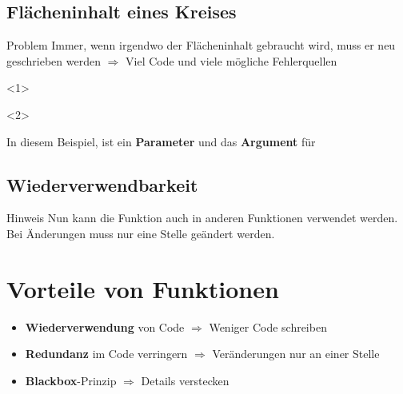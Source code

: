 \subsection{Flächeninhalt eines Kreises}
\begin{frame}
    \slidehead

    \begin{block}{Problem}
        Immer, wenn irgendwo der Flächeninhalt gebraucht wird, muss er neu geschrieben werden $\Rightarrow$ Viel Code und viele mögliche Fehlerquellen
    \end{block}
\end{frame}

\begin{frame}
    \slidehead
    \vspace{-1ex}
    \begin{onlyenv}<1>
    \end{onlyenv}

    \begin{onlyenv}<2>
    \end{onlyenv}
    \pause
    In diesem Beispiel, ist  ein \textbf{Parameter} und  das \textbf{Argument} für 
\end{frame}

\subsection{Wiederverwendbarkeit}
\begin{frame}
    \slidehead
    \vspace{-1ex}
    \vspace{-1ex}
    \begin{block}{Hinweis}
        Nun kann die Funktion auch in anderen Funktionen verwendet werden.
        Bei Änderungen muss nur eine Stelle geändert werden.
    \end{block}
\end{frame}

\section{Vorteile von Funktionen}
\begin{frame}
    \slidehead

    \begin{itemize}
        \item \textbf{Wiederverwendung} von Code $\Rightarrow$ Weniger Code schreiben
        \item \textbf{Redundanz} im Code verringern $\Rightarrow$ Veränderungen nur an einer Stelle
        \item \textbf{Blackbox}-Prinzip $\Rightarrow$ Details verstecken
    \end{itemize}
\end{frame}

